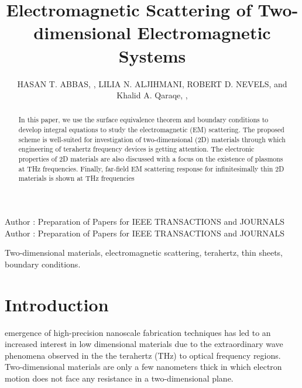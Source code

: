 \documentclass{ieeeaccess}
\renewcommand{\^}{\hat}  %
\begin{document}

\title{Electromagnetic Scattering of Two-dimensional Electromagnetic Systems}
\author{\uppercase{Hasan T. Abbas}, ,
\uppercase{Lilia N. Aljihmani},
\uppercase{Robert D. Nevels},
and Khalid A. Qaraqe,
,
}
\address[1]{James Watt School of Engineering, University of Glasgow, G12 8QQ UK (e-mail: Hasan.Abbas@glasgow.ac.uk)}
\address[2]{Department of Electrical \& Computer Engineering, Texas A\&M University at Qatar, Doha, 
23874}
\address[3]{Department of Electrical \& Computer Engineering, Texas A\&M University, College Station, TX 77843}
\tfootnote{}

\markboth
{Author \headeretal: Preparation of Papers for IEEE TRANSACTIONS and JOURNALS}
{Author \headeretal: Preparation of Papers for IEEE TRANSACTIONS and JOURNALS}


\begin{abstract}
In this paper, we use the surface equivalence theorem and boundary conditions to develop integral equations to study the electromagnetic (EM) scattering. The proposed scheme is well-suited for investigation of two-dimensional (2D) materials through which engineering of terahertz frequency devices is getting attention. The electronic properties of 2D materials are also discussed with a focus on the existence of plasmons at THz frequencies. Finally, far-field EM scattering response for infinitesimally thin 2D materials is shown at THz frequencies
\end{abstract}

\begin{keywords}
Two-dimensional materials, electromagnetic scattering, terahertz, thin sheets, boundary conditions.
\end{keywords}

\titlepgskip=-15pt

\maketitle

\section{Introduction}
\label{sec:introduction}
 emergence of high-precision nanoscale fabrication techniques has led to an increased interest in low dimensional materials due to the extraordinary wave phenomena observed in the the terahertz (THz) to optical frequency regions. Two-dimensional materials are only a few nanometers thick in which electron motion does not face any resistance in a two-dimensional plane. 
\end{document}
